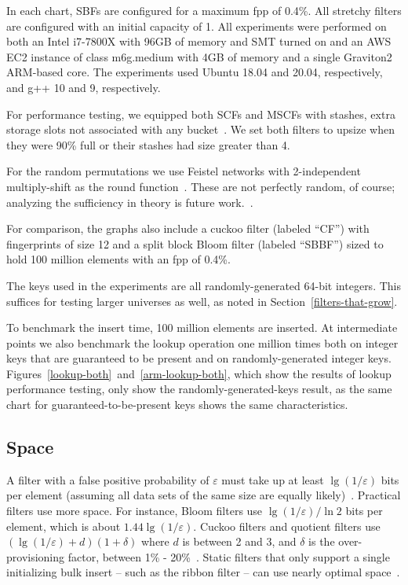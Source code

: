 \documentclass[letterpaper,twocolumn,10pt]{article}
\newcommand{\taffy}{stretchy}
\newcommand{\TBF}{SBF}
\newcommand{\TCF}{SCF}
\newcommand{\MTCF}{MSCF}
\newcommand{\taffy}{taffy}
\newcommand{\TBF}{TBF}
\newcommand{\TCF}{TCF}
\newcommand{\MTCF}{MTCF}
\begin{document}
In each chart, \TBF{}s are configured for a maximum fpp of 0.4\%.
All \taffy{} filters are configured with an initial capacity of 1. %
All experiments were performed on both an Intel i7-7800X with 96GB of memory and SMT turned on and an AWS EC2 instance of class m6g.medium with 4GB of memory and a single Graviton2 ARM-based core.
The experiments used Ubuntu 18.04 and 20.04, respectively, and g++ 10 and 9, respectively.

For performance testing, we equipped both \TCF{}s and \MTCF{}s with stashes, extra storage slots not associated with any bucket~\cite{stash}.
We set both filters to upsize when they were 90\% full or their stashes had size greater than 4.

For the random permutations we use Feistel networks with 2-independent multiply-shift as the round function~\cite{two-independent-multiply-shift}.
These are not perfectly random, of course; analyzing the sufficiency in theory is future work.~\cite{why-simple,backyard}.

For comparison, the graphs also include a cuckoo filter (labeled ``CF'') with fingerprints of size 12 and a split block Bloom filter (labeled ``SBBF'') sized to hold 100 million elements with an fpp of 0.4\%.

The keys used in the experiments are all randomly-generated 64-bit integers.
This suffices for testing larger universes as well, as noted in Section~\ref{filters-that-grow}.

To benchmark the insert time, 100 million elements are inserted.
At intermediate points we also benchmark the lookup operation one million times both on integer keys that are guaranteed to be present and on randomly-generated integer keys.
Figures~\ref{lookup-both}~and~\ref{arm-lookup-both}, which show the results of lookup performance testing, only show the randomly-generated-keys result, as the same chart for guaranteed-to-be-present keys shows the same characteristics.

\subsection{Space}

A filter with a false positive probability of $\varepsilon$ must take up at least $\lg (1/\varepsilon)$ bits per element (assuming all data sets of the same size are equally likely)~\cite{lower-bound}.
Practical filters use more space.
For instance, Bloom filters use $\lg (1/\varepsilon)/\ln 2$ bits per element, which is about $1.44 \lg (1/\varepsilon)$.
Cuckoo filters and quotient filters use $(\lg (1/\varepsilon) + d) (1 + \delta)$ where $d$ is between 2 and 3, and $\delta$ is the over-provisioning factor, between 1\% - 20\%~\cite{cuckoo,quotient-filter,vector-quotient}.
Static filters that only support a single initializing bulk insert -- such as the ribbon filter -- can use nearly optimal space~\cite{ribbon}.
\end{document}

